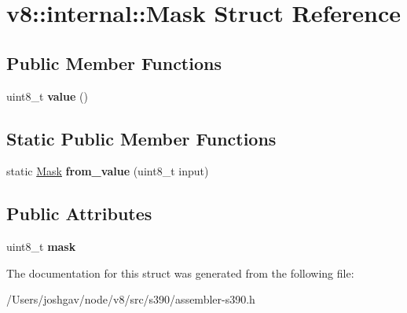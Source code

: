 \hypertarget{structv8_1_1internal_1_1_mask}{}\section{v8\+:\+:internal\+:\+:Mask Struct Reference}
\label{structv8_1_1internal_1_1_mask}
\subsection*{Public Member Functions}
\begin{DoxyCompactItemize}
\item 
uint8\+\_\+t {\bfseries value} ()\hypertarget{structv8_1_1internal_1_1_mask_aff3da6d78d7d27eaa9e753cbc68770a5}{}\label{structv8_1_1internal_1_1_mask_aff3da6d78d7d27eaa9e753cbc68770a5}

\end{DoxyCompactItemize}
\subsection*{Static Public Member Functions}
\begin{DoxyCompactItemize}
\item 
static \hyperlink{structv8_1_1internal_1_1_mask}{Mask} {\bfseries from\+\_\+value} (uint8\+\_\+t input)\hypertarget{structv8_1_1internal_1_1_mask_afbf293d24cf909b7deffb6f4ee30c9b5}{}\label{structv8_1_1internal_1_1_mask_afbf293d24cf909b7deffb6f4ee30c9b5}

\end{DoxyCompactItemize}
\subsection*{Public Attributes}
\begin{DoxyCompactItemize}
\item 
uint8\+\_\+t {\bfseries mask}\hypertarget{structv8_1_1internal_1_1_mask_a6506213101dedd2334800a76ee63d213}{}\label{structv8_1_1internal_1_1_mask_a6506213101dedd2334800a76ee63d213}

\end{DoxyCompactItemize}


The documentation for this struct was generated from the following file\+:\begin{DoxyCompactItemize}
\item 
/\+Users/joshgav/node/v8/src/s390/assembler-\/s390.\+h\end{DoxyCompactItemize}
